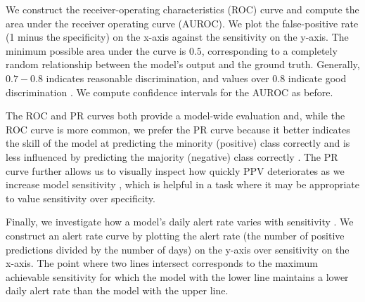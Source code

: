 \documentclass[fleqn,10pt]{wlscirep}
\begin{document}
We construct the receiver-operating characteristics (ROC) curve and compute the area under the receiver operating curve (AUROC). We plot the false-positive rate (1 minus the specificity) on the x-axis against the sensitivity on the y-axis. The minimum possible area under the curve is $0.5$, corresponding to a completely random relationship between the model’s output and the ground truth. Generally, $0.7-0.8$ indicates reasonable discrimination, and values over $0.8$ indicate good discrimination \cite{Smith13}. We compute confidence intervals for the AUROC as before.

The ROC and PR curves both provide a model-wide evaluation and, while the ROC curve is more common, we prefer the PR curve because it better indicates the skill of the model at predicting the minority (positive) class correctly and is less influenced by predicting the majority (negative) class correctly \cite{Saito15}. The PR curve further allows us to visually inspect how quickly PPV deteriorates as we increase model sensitivity \cite{Davis06}, which is helpful in a task where it may be appropriate to value sensitivity over specificity.

Finally, we investigate how a model’s daily alert rate varies with sensitivity \cite{Romero21}. We construct an alert rate curve by plotting the alert rate (the number of positive predictions divided by the number of days) on the y-axis over sensitivity on the x-axis. The point where two lines intersect corresponds to the maximum achievable sensitivity for which the model with the lower line maintains a lower daily alert rate than the model with the upper line.

\end{document}
